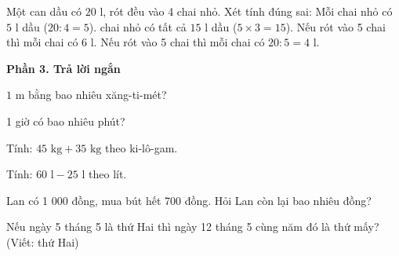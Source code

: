\begin{ex} %
Một can dầu có $20\text{ l}$, rót đều vào 4 chai nhỏ. Xét tính đúng sai:
\choiceTF
{\True Mỗi chai nhỏ có $5\text{ l}$ dầu ($20 : 4 = 5$).}
{ chai nhỏ có tất cả $15\text{ l}$ dầu ($5 \times 3 = 15$).}
{Nếu rót vào 5 chai thì mỗi chai có $6\text{ l}$.}
{\True Nếu rót vào 5 chai thì mỗi chai có $20 : 5 = 4\text{ l}$.}
\end{ex}

\textbf{Phần 3. Trả lời ngắn}

\begin{ex} %
$1\text{ m}$ bằng bao nhiêu xăng-ti-mét?
\end{ex}

\begin{ex} %
1 giờ có bao nhiêu phút?
\end{ex}

\begin{ex} %
Tính: $45\text{ kg} + 35\text{ kg}$ theo ki-lô-gam.
\end{ex}

\begin{ex} %
Tính: $60\text{ l} - 25\text{ l}$ theo lít.
\end{ex}

\begin{ex} %
Lan có 1 000 đồng, mua bút hết 700 đồng. Hỏi Lan còn lại bao nhiêu đồng?
\end{ex}

\begin{ex} %
Nếu ngày 5 tháng 5 là thứ Hai thì ngày 12 tháng 5 cùng năm đó là thứ mấy? (Viết: thứ Hai)
\end{ex}
